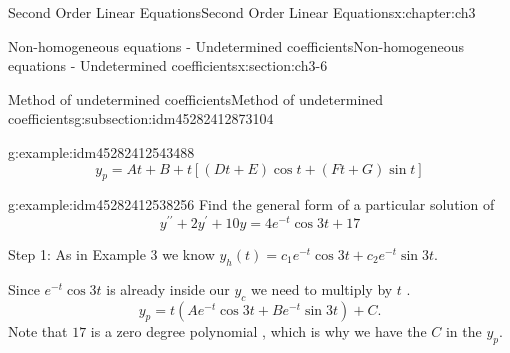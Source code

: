 \documentclass[oneside,10pt,]{book}
\numberwithin{equation}{section}
\numberwithin{equation}{section}
\begin{document}
\begin{chapterptx}{Second Order Linear Equations}{}{Second Order Linear Equations}{}{}{x:chapter:ch3}
\begin{sectionptx}{Non-homogeneous equations - Undetermined coefficients}{}{Non-homogeneous equations - Undetermined coefficients}{}{}{x:section:ch3-6}
\begin{subsectionptx}{Method of undetermined coefficients}{}{Method of undetermined coefficients}{}{}{g:subsection:idm45282412873104}
\begin{example}{}{g:example:idm45282412543488}
\begin{equation*}
y_{p}=At+B+t\left[\left(Dt+E\right)\cos t+\left(Ft+G\right)\sin t\right]
\end{equation*}
%
\end{example}
\begin{example}{}{g:example:idm45282412538256}%
Find the general form of a particular solution of%
\begin{equation*}
y^{\prime\prime}+2y^{\prime}+10y=4e^{-t}\cos3t+17
\end{equation*}
%
\par
Step 1: As in Example 3 we know \(y_{h}(t)=c_{1}e^{-t}\cos3t+c_{2}e^{-t}\sin3t.\)%
\par
Since \(e^{-t}\cos3t\) is already inside our \(y_{c}\) we need to multiply by \(t\) .%
\begin{equation*}
y_{p}=t\left(Ae^{-t}\cos3t+Be^{-t}\sin3t\right)+C.
\end{equation*}
Note that \(17\) is a zero degree polynomial , which is why we have the \(C\) in the \(y_{p}\).%
\end{example}
\end{subsectionptx}
\end{sectionptx}
\end{chapterptx}
%
%
%
%
\typeout{************************************************}
\typeout{************************************************}
%
%
\appendix
%
\end{document}
